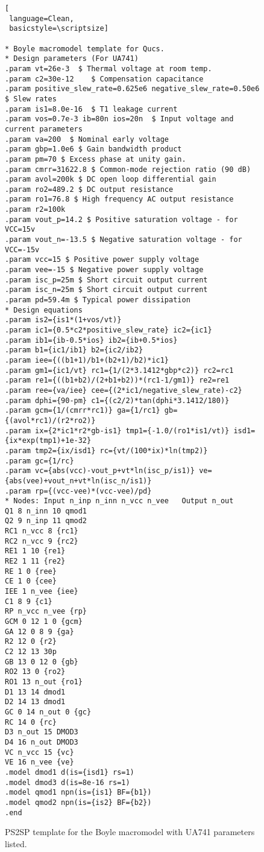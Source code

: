 \begin{figure} 
  \centering
\begin{lstlisting}[
 language=Clean, 
 basicstyle=\scriptsize]

* Boyle macromodel template for Qucs.
* Design parameters (For UA741)
.param vt=26e-3  $ Thermal voltage at room temp.
.param c2=30e-12    $ Compensation capacitance
.param positive_slew_rate=0.625e6 negative_slew_rate=0.50e6  $ Slew rates
.param is1=8.0e-16  $ T1 leakage current
.param vos=0.7e-3 ib=80n ios=20n  $ Input voltage and current parameters
.param va=200  $ Nominal early voltage
.param gbp=1.0e6 $ Gain bandwidth product
.param pm=70 $ Excess phase at unity gain.
.param cmrr=31622.8 $ Common-mode rejection ratio (90 dB)
.param avol=200k $ DC open loop differential gain
.param ro2=489.2 $ DC output resistance
.param ro1=76.8 $ High frequency AC output resistance
.param r2=100k
.param vout_p=14.2 $ Positive saturation voltage - for VCC=15v
.param vout_n=-13.5 $ Negative saturation voltage - for VCC=-15v
.param vcc=15 $ Positive power supply voltage
.param vee=-15 $ Negative power supply voltage
.param isc_p=25m $ Short circuit output current
.param isc_n=25m $ Short circuit output current
.param pd=59.4m $ Typical power dissipation
* Design equations
.param is2={is1*(1+vos/vt)}
.param ic1={0.5*c2*positive_slew_rate} ic2={ic1}
.param ib1={ib-0.5*ios} ib2={ib+0.5*ios}
.param b1={ic1/ib1} b2={ic2/ib2}
.param iee={((b1+1)/b1+(b2+1)/b2)*ic1}
.param gm1={ic1/vt} rc1={1/(2*3.1412*gbp*c2)} rc2=rc1
.param re1={((b1+b2)/(2+b1+b2))*(rc1-1/gm1)} re2=re1
.param ree={va/iee} cee={(2*ic1/negative_slew_rate)-c2}
.param dphi={90-pm} c1={(c2/2)*tan(dphi*3.1412/180)}
.param gcm={1/(cmrr*rc1)} ga={1/rc1} gb={(avol*rc1)/(r2*ro2)}
.param ix={2*ic1*r2*gb-is1} tmp1={-1.0/(ro1*is1/vt)} isd1={ix*exp(tmp1)+1e-32}
.param tmp2={ix/isd1} rc={vt/(100*ix)*ln(tmp2)}
.param gc={1/rc}
.param vc={abs(vcc)-vout_p+vt*ln(isc_p/is1)} ve={abs(vee)+vout_n+vt*ln(isc_n/is1)}
.param rp={(vcc-vee)*(vcc-vee)/pd}
* Nodes: Input n_inp n_inn n_vcc n_vee   Output n_out
Q1 8 n_inn 10 qmod1
Q2 9 n_inp 11 qmod2
RC1 n_vcc 8 {rc1}
RC2 n_vcc 9 {rc2}
RE1 1 10 {re1}
RE2 1 11 {re2}
RE 1 0 {ree}
CE 1 0 {cee}
IEE 1 n_vee {iee}
C1 8 9 {c1}
RP n_vcc n_vee {rp}
GCM 0 12 1 0 {gcm}
GA 12 0 8 9 {ga}
R2 12 0 {r2}
C2 12 13 30p
GB 13 0 12 0 {gb}
RO2 13 0 {ro2}
RO1 13 n_out {ro1}
D1 13 14 dmod1
D2 14 13 dmod1
GC 0 14 n_out 0 {gc}
RC 14 0 {rc}
D3 n_out 15 DMOD3
D4 16 n_out DMOD3
VC n_vcc 15 {vc}
VE 16 n_vee {ve}
.model dmod1 d(is={isd1} rs=1)
.model dmod3 d(is=8e-16 rs=1)
.model qmod1 npn(is={is1} BF={b1})
.model qmod2 npn(is={is2} BF={b2})
.end
\end{lstlisting}
  \caption{PS2SP template for the Boyle macromodel with UA741 parameters listed. } 
  \label{fig:opamp46}
\end{figure}

